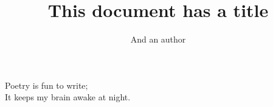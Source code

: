 \documentclass[letterpaper]{article}
\title{This document has a title}
\author{And an author}
\date{}
\begin{document}
\maketitle

\noindent Poetry is fun to write; \\
It keeps my brain awake at night. \\
\end{document}
